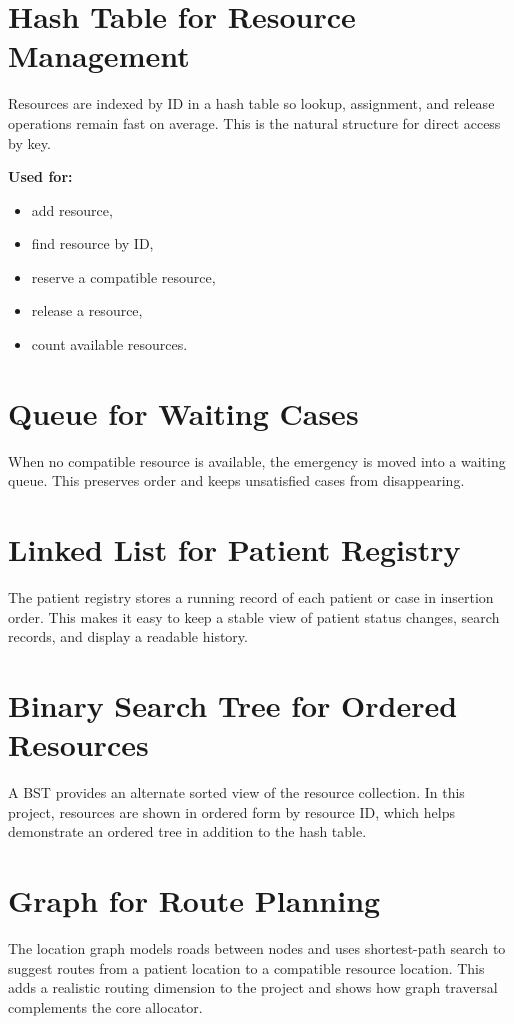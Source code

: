 \documentclass[12pt,a4paper]{report}
\begin{document}
\section{Hash Table for Resource Management}
Resources are indexed by ID in a hash table so lookup, assignment, and release operations remain fast on average. This is the natural structure for direct access by key.

\textbf{Used for:}
\begin{itemize}[leftmargin=1.2cm]
  \item add resource,
  \item find resource by ID,
  \item reserve a compatible resource,
  \item release a resource,
  \item count available resources.
\end{itemize}

\section{Queue for Waiting Cases}
When no compatible resource is available, the emergency is moved into a waiting queue. This preserves order and keeps unsatisfied cases from disappearing.

\section{Linked List for Patient Registry}
The patient registry stores a running record of each patient or case in insertion order. This makes it easy to keep a stable view of patient status changes, search records, and display a readable history.

\section{Binary Search Tree for Ordered Resources}
A BST provides an alternate sorted view of the resource collection. In this project, resources are shown in ordered form by resource ID, which helps demonstrate an ordered tree in addition to the hash table.

\section{Graph for Route Planning}
The location graph models roads between nodes and uses shortest-path search to suggest routes from a patient location to a compatible resource location. This adds a realistic routing dimension to the project and shows how graph traversal complements the core allocator.
\end{document}
